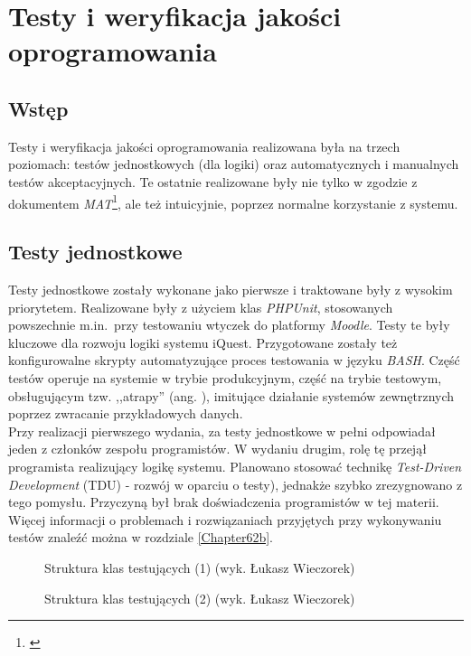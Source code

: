 \chapter{Testy i weryfikacja jakości oprogramowania}
\label{Chapter7}

\section{Wstęp}
\label{Chapter71}

Testy i weryfikacja jakości oprogramowania realizowana była na trzech poziomach: testów jednostkowych (dla logiki) oraz automatycznych i manualnych testów akceptacyjnych. Te ostatnie realizowane były nie tylko w zgodzie z dokumentem \textit{MAT}\footnote{\cite{Redmine:ProjDocs}}, ale też intuicyjnie, poprzez normalne korzystanie z systemu.

\section{Testy jednostkowe}
\label{Chapter72}

Testy jednostkowe zostały wykonane jako pierwsze i traktowane były z wysokim priorytetem. Realizowane były z użyciem klas \textit{PHPUnit}, stosowanych powszechnie m.in.~przy testowaniu wtyczek do platformy \textit{Moodle}. Testy te były kluczowe dla rozwoju logiki systemu iQuest. Przygotowane zostały też konfigurowalne skrypty automatyzujące proces testowania w języku \textit{BASH}. Część testów operuje na systemie w trybie produkcyjnym, część na trybie testowym, obsługującym tzw. ,,atrapy'' (ang. ), imitujące działanie systemów zewnętrznych poprzez zwracanie przykładowych danych.\\

Przy realizacji pierwszego wydania, za testy jednostkowe w pełni odpowiadał jeden z członków zespołu programistów. W wydaniu drugim, rolę tę przejął programista realizujący logikę systemu. Planowano stosować technikę \textit{Test-Driven Development} (TDU) - rozwój w oparciu o testy), jednakże szybko zrezygnowano z tego pomysłu. Przyczyną był brak doświadczenia programistów w tej materii. Więcej informacji o problemach i rozwiązaniach przyjętych przy wykonywaniu testów znaleźć można w rozdziale \ref{Chapter62b}.

\newpage
\begin{figure}[H]
\begin{center}
 
\end{center}
\caption{Struktura klas testujących (1) (wyk. Łukasz Wieczorek)}
\label{fig:tests1}
\end{figure}
\newpage
\begin{figure}[H]
\begin{center}
 
\end{center}
\caption{Struktura klas testujących (2) (wyk. Łukasz Wieczorek)}
\label{fig:tests2}
\end{figure}
\newpage

